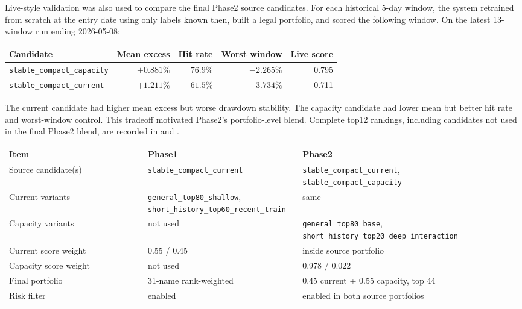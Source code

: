 \documentclass[11pt]{article}
\begin{document}
Live-style validation was also used to compare the final Phase2 source
candidates. For each historical 5-day window, the system retrained from scratch
at the entry date using only labels known then, built a legal portfolio, and
scored the following window. On the latest 13-window run ending 2026-05-08:

\begin{table}[h]
\centering
\begin{tabular}{lrrrr}
\toprule
Candidate & Mean excess & Hit rate & Worst window & Live score \\
\midrule
\texttt{stable\_compact\_capacity} & \(+0.881\%\) & \(76.9\%\) & \(-2.265\%\) & 0.795 \\
\texttt{stable\_compact\_current} & \(+1.211\%\) & \(61.5\%\) & \(-3.734\%\) & 0.711 \\
\bottomrule
\end{tabular}
\end{table}

The current candidate had higher mean excess but worse drawdown stability. The
capacity candidate had lower mean but better hit rate and worst-window control.
This tradeoff motivated Phase2's portfolio-level blend. Complete top12
rankings, including candidates not used in the final Phase2 blend, are recorded
in  and
.

\begin{table}[h]
\centering
\begin{tabular}{p{0.28\linewidth}p{0.28\linewidth}p{0.34\linewidth}}
\toprule
Item & Phase1 & Phase2 \\
\midrule
Source candidate(s) & \texttt{stable\_compact\_current} & \texttt{stable\_compact\_current}, \texttt{stable\_compact\_capacity} \\
Current variants & \texttt{general\_top80\_shallow}, \texttt{short\_history\_top60\_recent\_train} & same \\
Capacity variants & not used & \texttt{general\_top80\_base}, \texttt{short\_history\_top20\_deep\_interaction} \\
Current score weight & 0.55 / 0.45 & inside source portfolio \\
Capacity score weight & not used & 0.978 / 0.022 \\
Final portfolio & 31-name rank-weighted & 0.45 current + 0.55 capacity, top 44 \\
Risk filter & enabled & enabled in both source portfolios \\
\bottomrule
\end{tabular}
\end{table}
\end{document}
